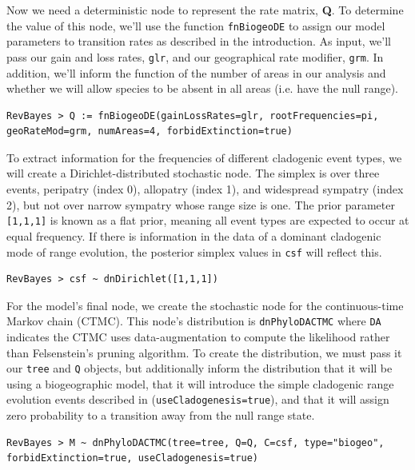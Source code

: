 \documentclass[11pt]{article}
\begin{document}
Now we need a deterministic node to represent the rate matrix, {\bf Q}.
To determine the value of this node, we'll use the function {\tt fnBiogeoDE} to assign our model parameters to transition rates as described in the introduction.
As input, we'll pass our gain and loss rates, {\tt glr}, and our geographical rate modifier, {\tt grm}.
In addition, we'll inform the function of the number of areas in our analysis and whether we will allow species to be absent in all areas (i.e. have the null range).

\begin{snugshade}
\begin{lstlisting}
RevBayes > Q := fnBiogeoDE(gainLossRates=glr, rootFrequencies=pi, geoRateMod=grm, numAreas=4, forbidExtinction=true)
\end{lstlisting}
\end{snugshade}

To extract information for the frequencies of different cladogenic event types, we will create a Dirichlet-distributed stochastic node.
The simplex is over three events, peripatry (index 0), allopatry (index 1), and widespread sympatry (index 2), but not over narrow sympatry whose range size is one.
The prior parameter {\tt [1,1,1]} is known as a flat prior, meaning all event types are expected to occur at equal frequency.
If there is information in the data of a dominant cladogenic mode of range evolution, the posterior simplex values in {\tt csf} will reflect this.

\begin{snugshade}
\begin{lstlisting}
RevBayes > csf ~ dnDirichlet([1,1,1])
\end{lstlisting}
\end{snugshade}

For the model's final node, we create the stochastic node for the continuous-time Markov chain (CTMC).
This node's distribution is {\tt dnPhyloDACTMC} where {\tt DA} indicates the CTMC uses data-augmentation to compute the likelihood rather than Felsenstein's pruning algorithm.
To create the distribution, we must pass it our {\tt tree} and {\tt Q} objects, but additionally inform the distribution that it will be using a biogeographic model, that it will introduce the simple cladogenic range evolution events described in \citet{ree08} ({\tt useCladogenesis=true}), and that it will assign zero probability to a transition away from the null range state.

\begin{snugshade}
\begin{lstlisting}
RevBayes > M ~ dnPhyloDACTMC(tree=tree, Q=Q, C=csf, type="biogeo", forbidExtinction=true, useCladogenesis=true)
\end{lstlisting}
\end{snugshade}
\end{document}
